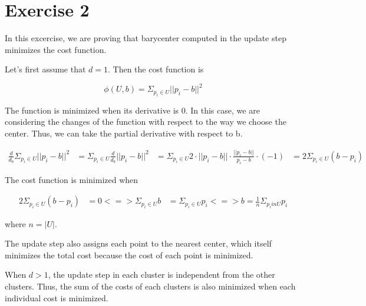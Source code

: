 \section*{Exercise 2}
In this excercise, we are proving that barycenter computed in the update step minimizes the cost function.

Let's first assume that $d = 1$. Then the cost function is 

$$\phi(U,b) = \Sigma_{p_i \in U} ||p_i - b||^2$$

The function is minimized when its derivative is 0. In this case, we are considering the changes of the function with respect to the way
we choose the center. Thus, we can take the partial derivative with respect to b.

\begin{align*}
  \frac{d}{d_b} \Sigma_{p_i \in U} ||p_i - b||^2 &= \Sigma_{p_i \in U} \frac{d}{d_b} ||p_i - b||^2
  &= \Sigma_{p_i \in U} 2 \cdot ||p_i - b|| \cdot \frac{||p_i - b||}{p_i - b} \cdot (-1)
  &= 2 \Sigma_{p_i \in U} (b - p_i)
\end{align*}

The cost function is minimized when 

\begin{align*}
  2 \Sigma_{p_i \in U} (b - p_i) &= 0
  <=> \Sigma_{p_i \in U} b &= \Sigma_{p_i \in U} p_i
  <=> b = \frac{1}{n} \Sigma_{p_i in U} p_i
\end{align*}

where $n = |U|$.

The update step also assigns each point to the nearest center, which itself minimizes the total cost because the cost of each point is minimized.

When $d > 1$, the update step in each cluster is independent from the other clusters. Thus, the sum of the costs of each clusters is also minimized when each individual 
cost is minimized.
